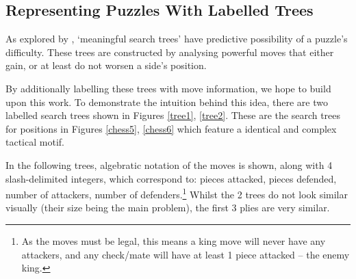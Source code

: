 \subsection{Representing Puzzles With Labelled Trees}\label{treeS11}

As explored by \citet{chessTrees}, `meaningful search trees' have predictive
possibility of a puzzle's difficulty. These trees are constructed by analysing
powerful moves that either gain, or at least do not worsen a side's position. 

By additionally labelling these trees with move information, we hope to build
upon this work. To demonstrate the intuition behind this idea, there are two
labelled search trees shown in Figures \ref{tree1}, \ref{tree2}. These are the
search trees for positions in Figures \ref{chess5}, \ref{chess6} which feature
a identical and complex tactical motif. 

In the following trees, algebratic notation of the moves is shown, along with 4
slash-delimited integers, which correspond to: pieces attacked, pieces
defended, number of attackers, number of defenders.\footnote{As the moves must
be legal, this means a king move will never have any attackers, and any
check/mate will have at least 1 piece attacked -- the enemy king.} Whilst the 2
trees do not look similar visually (their size being the main problem), the
first 3 plies are very similar. 

